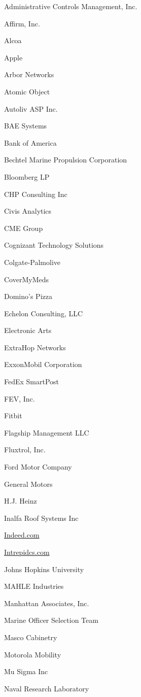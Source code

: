 \documentclass[twoside]{article}
\begin{document}
\begin{center}
\begin{multicols}{5}
\begin{FlushLeft}
\begin{compactitem}
\item Administrative Controls Management, Inc.
\item Affirm, Inc.
\item Alcoa
\item Apple
\item Arbor Networks
\item Atomic Object
\item Autoliv ASP Inc.
\item BAE Systems
\item Bank of America
\item Bechtel Marine Propulsion Corporation
\item Bloomberg LP
\item CHP Consulting Inc
\item Civis Analytics
\item CME Group
\item Cognizant Technology Solutions
\item Colgate-Palmolive
\item CoverMyMeds
\item Domino's Pizza
\item Echelon Consulting, LLC
\item Electronic Arts
\item ExtraHop Networks
\item ExxonMobil Corporation
\item FedEx SmartPost
\item FEV, Inc.
\item Fitbit
\item Flagship Management LLC
\item Fluxtrol, Inc.
\item Ford Motor Company
\item General Motors
\item H.J. Heinz
\item Inalfa Roof Systems Inc
\item \url{Indeed.com}
\item \url{Intrepidcs.com}
\item Johns Hopkins University
\item MAHLE Industries
\item Manhattan Associates, Inc.
\item Marine Officer Selection Team
\item Masco Cabinetry
\item Motorola Mobility
\item Mu Sigma Inc
\item Naval Research Laboratory

\end{compactitem}
\end{FlushLeft}
\end{multicols}
\end{center}
\end{document}

